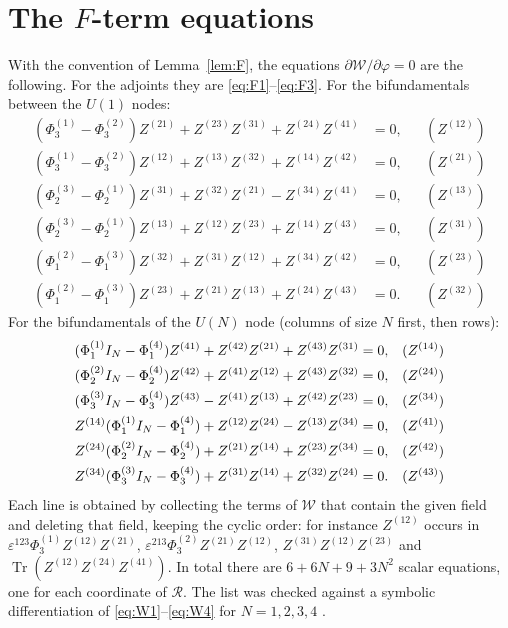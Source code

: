 \documentclass[11pt]{amsart}
\theoremstyle{definition}
\newcommand{\Tr}{\operatorname{Tr}}
\newcommand{\cR}{\mathcal R}
\newcommand{\cW}{\mathcal W}
\begin{document}
\section{The \texorpdfstring{$F$}{F}-term equations}\label{app:fterms}
With the convention of Lemma~\ref{lem:F}, the equations $\partial\cW/\partial\varphi=0$ are the following. For the adjoints they are \eqref{eq:F1}--\eqref{eq:F3}. For the bifundamentals between the $U(1)$ nodes:
\begin{align*}
(\Phi^{(1)}_3-\Phi^{(2)}_3)Z^{(21)}+Z^{(23)}Z^{(31)}+Z^{(24)}Z^{(41)}&=0, &&(Z^{(12)})\\
(\Phi^{(1)}_3-\Phi^{(2)}_3)Z^{(12)}+Z^{(13)}Z^{(32)}+Z^{(14)}Z^{(42)}&=0, &&(Z^{(21)})\\
(\Phi^{(3)}_2-\Phi^{(1)}_2)Z^{(31)}+Z^{(32)}Z^{(21)}-Z^{(34)}Z^{(41)}&=0, &&(Z^{(13)})\\
(\Phi^{(3)}_2-\Phi^{(1)}_2)Z^{(13)}+Z^{(12)}Z^{(23)}+Z^{(14)}Z^{(43)}&=0, &&(Z^{(31)})\\
(\Phi^{(2)}_1-\Phi^{(3)}_1)Z^{(32)}+Z^{(31)}Z^{(12)}+Z^{(34)}Z^{(42)}&=0, &&(Z^{(23)})\\
(\Phi^{(2)}_1-\Phi^{(3)}_1)Z^{(23)}+Z^{(21)}Z^{(13)}+Z^{(24)}Z^{(43)}&=0. &&(Z^{(32)})
\end{align*}
For the bifundamentals of the $U(N)$ node (columns of size $N$ first, then rows):
\begin{align}
(\Phi^{(1)}_1I_N-\Phi^{(4)}_1)Z^{(41)}+Z^{(42)}Z^{(21)}+Z^{(43)}Z^{(31)}&=0, &&(Z^{(14)})\notag\\
(\Phi^{(2)}_2I_N-\Phi^{(4)}_2)Z^{(42)}+Z^{(41)}Z^{(12)}+Z^{(43)}Z^{(32)}&=0, &&(Z^{(24)})\notag\\
(\Phi^{(3)}_3I_N-\Phi^{(4)}_3)Z^{(43)}-Z^{(41)}Z^{(13)}+Z^{(42)}Z^{(23)}&=0, &&(Z^{(34)})\notag\\
Z^{(14)}(\Phi^{(1)}_1I_N-\Phi^{(4)}_1)+Z^{(12)}Z^{(24)}-Z^{(13)}Z^{(34)}&=0, &&(Z^{(41)})\label{eq:Z41}\\
Z^{(24)}(\Phi^{(2)}_2I_N-\Phi^{(4)}_2)+Z^{(21)}Z^{(14)}+Z^{(23)}Z^{(34)}&=0, &&(Z^{(42)})\notag\\
Z^{(34)}(\Phi^{(3)}_3I_N-\Phi^{(4)}_3)+Z^{(31)}Z^{(14)}+Z^{(32)}Z^{(24)}&=0. &&(Z^{(43)})\notag
\end{align}
Each line is obtained by collecting the terms of $\cW$ that contain the given field and deleting that field, keeping the cyclic order: for instance $Z^{(12)}$ occurs in $\varepsilon^{123}\Phi^{(1)}_3Z^{(12)}Z^{(21)}$, $\varepsilon^{213}\Phi^{(2)}_3Z^{(21)}Z^{(12)}$, $Z^{(31)}Z^{(12)}Z^{(23)}$ and $\Tr(Z^{(12)}Z^{(24)}Z^{(41)})$. In total there are $6+6N+9+3N^2$ scalar equations, one for each coordinate of $\cR$. The list was checked against a symbolic differentiation of \eqref{eq:W1}--\eqref{eq:W4} for $N=1,2,3,4$ \cite{Bha26}.
\end{document}
